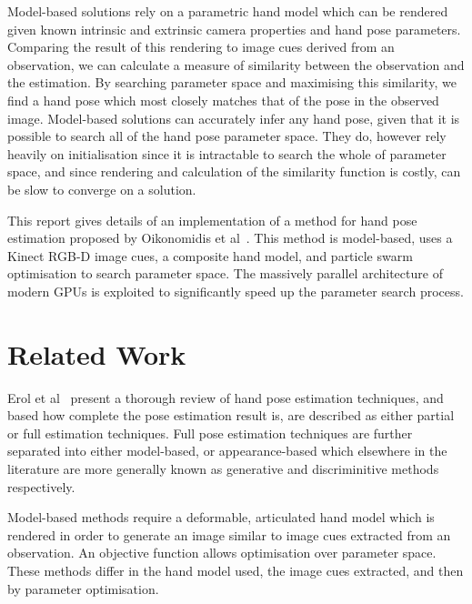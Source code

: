 \documentclass[10pt,a4paper,notitlepage,twocolumn]{report}
\begin{document}
Model-based solutions rely on a parametric hand model which can be rendered given known intrinsic and extrinsic camera properties and hand pose parameters.  Comparing the result of this rendering to image cues derived from an observation, we can calculate a measure of similarity between the observation and the estimation.  By searching parameter space and maximising this similarity, we find a hand pose which most closely matches that of the pose in the observed image.  Model-based solutions can accurately infer any hand pose, given that it is possible to search all of the hand pose parameter space.  They do, however rely heavily on initialisation since it is intractable to search the whole of parameter space, and since rendering and calculation of the similarity function is costly, can be slow to converge on a solution.

This report gives details of an implementation of a method for hand pose estimation proposed by Oikonomidis et al~\cite{bmvc2011oikonom}.  This method is model-based, uses a Kinect RGB-D image cues, a composite hand model, and particle swarm optimisation to search parameter space.  The massively parallel architecture of modern GPUs is exploited to significantly speed up the parameter search process.

\section{Related Work}
Erol et al~\cite{erol2007vision} present a thorough review of hand pose estimation techniques, and based how complete the pose estimation result is, are described as either partial or full estimation techniques.  Full pose estimation techniques are further separated into either model-based, or appearance-based which elsewhere in the literature are more generally known as generative and discriminitive methods respectively.  

Model-based methods require a deformable, articulated hand model which is rendered in order to generate an image similar to image cues extracted from an observation.  An objective function allows optimisation over parameter space.  These methods differ in the hand model used, the image cues extracted, and then by parameter optimisation. 
\end{document}
